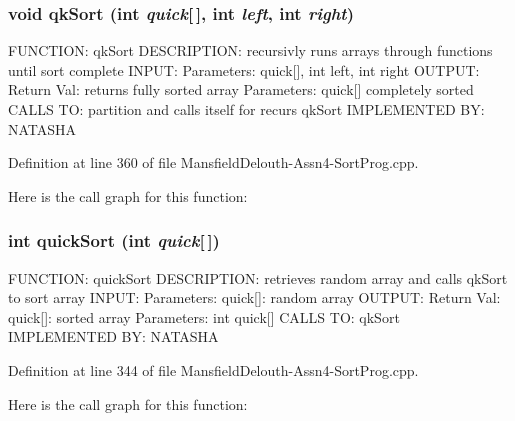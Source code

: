 \hypertarget{_mansfield_delouth-_assn4-_sort_prog_8cpp_a4b4f1e40ba9dfe94bf95212975063b17}{
\subsubsection[{qkSort}]{\setlength{\rightskip}{0pt plus 5cm}void qkSort (int {\em quick}\mbox{[}$\,$\mbox{]}, \/  int {\em left}, \/  int {\em right})}}
\label{_mansfield_delouth-_assn4-_sort_prog_8cpp_a4b4f1e40ba9dfe94bf95212975063b17}
FUNCTION: qkSort DESCRIPTION: recursivly runs arrays through functions until sort complete INPUT: Parameters: quick\mbox{[}\mbox{]}, int left, int right OUTPUT: Return Val: returns fully sorted array Parameters: quick\mbox{[}\mbox{]} completely sorted CALLS TO: partition and calls itself for recurs qkSort IMPLEMENTED BY: NATASHA 

Definition at line 360 of file MansfieldDelouth-\/Assn4-\/SortProg.cpp.



Here is the call graph for this function:

\hypertarget{_mansfield_delouth-_assn4-_sort_prog_8cpp_a9e940b0f849a62e9ff4319606269ae38}{
\subsubsection[{quickSort}]{\setlength{\rightskip}{0pt plus 5cm}int quickSort (int {\em quick}\mbox{[}$\,$\mbox{]})}}
\label{_mansfield_delouth-_assn4-_sort_prog_8cpp_a9e940b0f849a62e9ff4319606269ae38}
FUNCTION: quickSort DESCRIPTION: retrieves random array and calls qkSort to sort array INPUT: Parameters: quick\mbox{[}\mbox{]}: random array OUTPUT: Return Val: quick\mbox{[}\mbox{]}: sorted array Parameters: int quick\mbox{[}\mbox{]} CALLS TO: qkSort IMPLEMENTED BY: NATASHA 

Definition at line 344 of file MansfieldDelouth-\/Assn4-\/SortProg.cpp.



Here is the call graph for this function:

